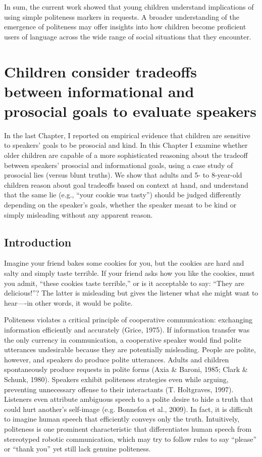 \documentclass[oneside]{report}
\begin{document}
In sum, the current work showed that young children understand
implications of using simple politeness markers in requests. A broader
understanding of the emergence of politeness may offer insights into how
children become proficient users of language across the wide range of
social situations that they encounter.

\chapter{Children consider tradeoffs between informational and prosocial
goals to evaluate
speakers}\label{children-consider-tradeoffs-between-informational-and-prosocial-goals-to-evaluate-speakers}


In the last Chapter, I reported on empirical evidence that children are
sensitive to speakers' goals to be prosocial and kind. In this Chapter I
examine whether older children are capable of a more sophisticated
reasoning about the tradeoff between speakers' prosocial and
informational goals, using a case study of prosocial lies (versus blunt
truths). We show that adults and 5- to 8-year-old children reason about
goal tradeoffs based on context at hand, and understand that the same
lie (e.g., ``your cookie was tasty'') should be judged differently
depending on the speaker's goals, whether the speaker meant to be kind
or simply misleading without any apparent reason.

\section{Introduction}\label{introduction-2}

Imagine your friend bakes some cookies for you, but the cookies are hard
and salty and simply taste terrible. If your friend asks how you like
the cookies, must you admit, ``these cookies taste terrible,'' or is it
acceptable to say: ``They are delicious!''? The latter is misleading but
gives the listener what she might want to hear----in other words, it
would be polite.

Politeness violates a critical principle of cooperative communication:
exchanging information efficiently and accurately (Grice, 1975). If
information transfer was the only currency in communication, a
cooperative speaker would find polite utterances undesirable because
they are potentially misleading. People are polite, however, and
speakers do produce polite utterances. Adults and children spontaneously
produce requests in polite forms (Axia \& Baroni, 1985; Clark \& Schunk,
1980). Speakers exhibit politeness strategies even while arguing,
preventing unnecessary offense to their interactants (T. Holtgraves,
1997). Listeners even attribute ambiguous speech to a polite desire to
hide a truth that could hurt another's self-image (e.g. Bonnefon et al.,
2009). In fact, it is difficult to imagine human speech that efficiently
conveys only the truth. Intuitively, politeness is one prominent
characteristic that differentiates human speech from stereotyped robotic
communication, which may try to follow rules to say ``please'' or
``thank you'' yet still lack genuine politeness.
\end{document}
